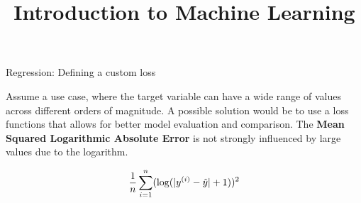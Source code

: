 \documentclass[11pt,compress,t,notes=noshow, xcolor=table]{beamer}
\title{Introduction to Machine Learning}
\institute{\href{https://compstat-lmu.github.io/lecture_i2ml/}{compstat-lmu.github.io/lecture\_i2ml}}
\date{}
\begin{document}








\begin{vbframe}{Regression: Defining a custom loss}

Assume a use case, where the target variable can have a wide range of values across different orders of magnitude.
A possible solution would be to use a loss functions that allows for better model evaluation and comparison.
The \textbf{Mean Squared Logarithmic Absolute Error} is not strongly influenced by large values due to the logarithm.

\[
\frac{1}{n} \sum_{i=1}^n (\log(|y^{(i)} - \hat{y}| + 1))^2
\]


\end{vbframe}

\end{document}
